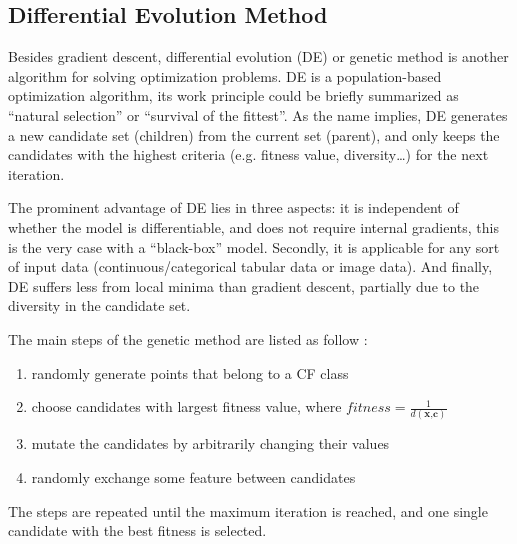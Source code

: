 \subsection{Differential Evolution Method}
Besides gradient descent, differential evolution (DE) or genetic method is another algorithm for solving optimization problems. DE is a population-based optimization algorithm, its work principle could be briefly summarized as ``natural selection'' or ``survival of the fittest''. As the name implies, DE generates a new candidate set (children) from the current set (parent), and only keeps the candidates with the highest criteria (e.g. fitness value, diversity\dots) for the next iteration.

The prominent advantage of DE lies in three aspects: it is independent of whether the model is differentiable, and does not require internal gradients, this is the very case with a ``black-box'' model. Secondly, it is applicable for any sort of input data (continuous/categorical tabular data or image data). And finally, DE suffers less from local minima than gradient descent, partially due to the diversity in the candidate set.

The main steps of the genetic method are listed as follow \cite{certifai}:
\begin{enumerate}
  \item randomly generate points that belong to a CF class
  \item choose candidates with largest fitness value, where $fitness=\frac{1}{d(\textbf{x,c})}$
  \item mutate the candidates by arbitrarily changing their values
  \item randomly exchange some feature between candidates
\end{enumerate}
The steps are repeated until the maximum iteration is reached, and one single candidate with the best fitness is selected.

